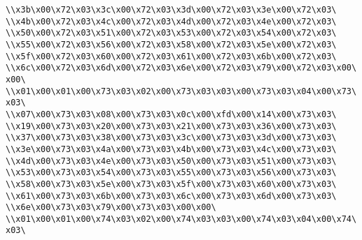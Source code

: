 \verb|\\x3b\x00\x72\x03\x3c\x00\x72\x03\x3d\x00\x72\x03\x3e\x00\x72\x03\|\newline
\verb|\\x4b\x00\x72\x03\x4c\x00\x72\x03\x4d\x00\x72\x03\x4e\x00\x72\x03\|\newline
\verb|\\x50\x00\x72\x03\x51\x00\x72\x03\x53\x00\x72\x03\x54\x00\x72\x03\|\newline
\verb|\\x55\x00\x72\x03\x56\x00\x72\x03\x58\x00\x72\x03\x5e\x00\x72\x03\|\newline
\verb|\\x5f\x00\x72\x03\x60\x00\x72\x03\x61\x00\x72\x03\x6b\x00\x72\x03\|\newline
\verb|\\x6c\x00\x72\x03\x6d\x00\x72\x03\x6e\x00\x72\x03\x79\x00\x72\x03\x00\x00\|\newline
\verb|\\x01\x00\x01\x00\x73\x03\x02\x00\x73\x03\x03\x00\x73\x03\x04\x00\x73\x03\|\newline
\verb|\\x07\x00\x73\x03\x08\x00\x73\x03\x0c\x00\xfd\x00\x14\x00\x73\x03\|\newline
\verb|\\x19\x00\x73\x03\x20\x00\x73\x03\x21\x00\x73\x03\x36\x00\x73\x03\|\newline
\verb|\\x37\x00\x73\x03\x38\x00\x73\x03\x3c\x00\x73\x03\x3d\x00\x73\x03\|\newline
\verb|\\x3e\x00\x73\x03\x4a\x00\x73\x03\x4b\x00\x73\x03\x4c\x00\x73\x03\|\newline
\verb|\\x4d\x00\x73\x03\x4e\x00\x73\x03\x50\x00\x73\x03\x51\x00\x73\x03\|\newline
\verb|\\x53\x00\x73\x03\x54\x00\x73\x03\x55\x00\x73\x03\x56\x00\x73\x03\|\newline
\verb|\\x58\x00\x73\x03\x5e\x00\x73\x03\x5f\x00\x73\x03\x60\x00\x73\x03\|\newline
\verb|\\x61\x00\x73\x03\x6b\x00\x73\x03\x6c\x00\x73\x03\x6d\x00\x73\x03\|\newline
\verb|\\x6e\x00\x73\x03\x79\x00\x73\x03\x00\x00\|\newline
\verb|\\x01\x00\x01\x00\x74\x03\x02\x00\x74\x03\x03\x00\x74\x03\x04\x00\x74\x03\|\newline
